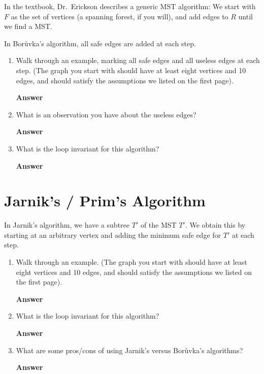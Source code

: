 \documentclass{article}
\begin{document}
In the textbook, Dr.~Erickson describes a generic MST algorithm: We start with
$F$ as the set of vertices (a spanning forest, if you will), and add edges to
$R$ until we find a MST.

In Bor\r{u}vka's algorithm, all safe edges are added at each step.

\begin{enumerate}

    \item Walk through an example, marking all safe edges and all useless edges
        at each step. (The graph you start with should have at least eight vertices
        and 10 edges, and should satisfy the assumptions we listed on the
        first page).

        \textbf{Answer}
        \vspace{3in}

    \item What is an observation you have about the useless edges?

        \textbf{Answer}
        \vspace{3in}

    \item What is the loop invariant for this algorithm?

        \textbf{Answer}
        \vspace{3in}

\end{enumerate}


\section*{Jarnik's / Prim's Algorithm}

In Jarnik's algorithm, we have a subtree $T'$ of the MST $T'$.  We obtain this
by starting at an arbitrary vertex and adding the minimum safe edge for $T'$ at
each step.


\begin{enumerate}

    \item Walk through an example. (The graph you start with should have at least eight vertices
        and 10 edges, and should satisfy the assumptions we listed on the
        first page).

        \textbf{Answer}
        \vspace{3in}

    \item What is the loop invariant for this algorithm?

        \textbf{Answer}
        \vspace{3in}

    \item What are
        some pros/cons of using Jarnik's versus Bor\r{u}vka's algorithms?

        \textbf{Answer}
        \vspace{3in}

\end{enumerate}
\end{document}
